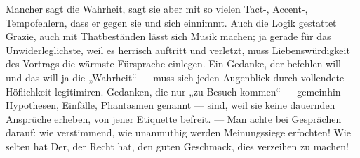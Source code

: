 Mancher sagt die Wahrheit, sagt sie aber mit so vielen Tact-, Accent-, Tempofehlern, dass er gegen sie und sich einnimmt. Auch die Logik gestattet Grazie, auch mit Thatbeständen lässt sich Musik machen; ja gerade für das Unwiderleglichste, weil es herrisch auftritt und verletzt, muss Liebenswürdigkeit des Vortrags die wärmste Fürsprache einlegen. Ein Gedanke, der befehlen will — und das will ja die „Wahrheit“ — muss sich jeden Augenblick durch vollendete Höflichkeit legitimiren. Gedanken, die nur „zu Besuch kommen“ — gemeinhin Hypothesen, Einfälle, Phantasmen genannt — sind, weil sie keine dauernden Ansprüche erheben, von jener Etiquette befreit. — Man achte bei Gesprächen darauf: wie verstimmend, wie unanmuthig werden Meinungssiege erfochten! Wie selten hat Der, der Recht hat, den guten Geschmack, dies verzeihen zu machen!
\par

